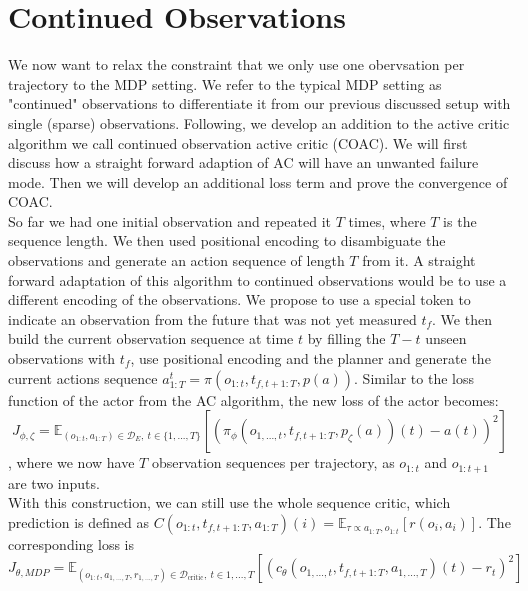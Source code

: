 \section{Continued Observations}
\label{sec:relax_dense}
We now want to relax the constraint that we only use one obervsation per trajectory to the MDP setting. 
We refer to the typical MDP setting as "continued" observations to differentiate it from our previous discussed setup with single (sparse) observations. 
Following, we develop an addition to the active critic algorithm we call continued observation active critic (COAC). 
We will first discuss how a straight forward adaption of AC will have an unwanted failure mode. Then we will develop an additional loss term and prove the convergence of COAC.\\

So far we had one initial observation and repeated it $T$ times, where $T$ is the sequence length. We then used positional encoding to disambiguate the observations and generate an action sequence of 
length $T$ from it. A straight forward adaptation of this algorithm to continued observations would be to use a different encoding of the observations. We propose to use a special token to indicate an 
observation from the future that was not yet measured $t_f$. We then build the current observation sequence at time $t$ by filling the $T - t$ unseen observations with $t_f$, use positional encoding and 
the planner and 
generate the current actions sequence $a^t_{1:T} = \pi(o_{1:t}, t_{f, t+1:T}, p(a))$. Similar to the loss function of the actor from the AC algorithm, the new loss of the actor becomes: 
\begin{equation}
    \label{dense_actor_objective}
    J_{\phi, \zeta} = \mathbb{E}_{(o_{1:t}, a_{1:T}) \in \mathcal{D}_E,\ t \in \{1, ..., T\}}\left[\left( \pi_{\phi}(o_{1, ..., t}, t_{f, t+1:T}, p_{\zeta}(a))(t) - a(t)\right)^2\right]
\end{equation}
, where we now have $T$ observation sequences per trajectory, as $o_{1:t}$ and $o_{1:t+1}$ are two inputs.\\
With this construction, we can still use the whole sequence critic, 
which prediction is defined as $C(o_{1:t}, t_{f, t+1:T}, a_{1:T})(i) = \mathbb{E}_{\tau \propto a_{1:T}, o_{1:t}}\left[r(o_i, a_i)\right]$. The corresponding loss is
\begin{equation}
    \label{eq:dense_critic_loss}
    J_{\theta, MDP} = \mathbb{E}_{(o_{1:t}, a_{1,...,T}, r_{1,...,T}) \in \mathcal{D}_{\text{critic}},\ t \in {1, ..., T}}\left[(c_{\theta}(o_{1, ..., t}, t_{f, t+1:T},  a_{1,...,T})(t) - r_t)^2\right]
\end{equation}

